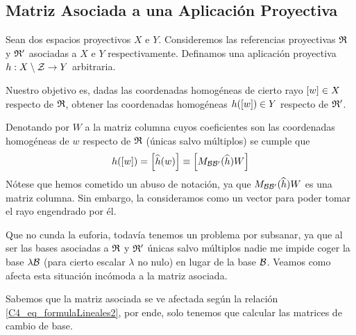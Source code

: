 \subsection{Matriz Asociada a una Aplicación Proyectiva}
Sean dos espacios proyectivos $X$ e $Y$. Consideremos las referencias proyectivas $\mathfrak{R}$ y $\mathfrak{R}'$ asociadas a $X$ e $Y$ respectivamente. Definamos una aplicación proyectiva $h:X\setminus \mathcal{Z}\to Y$ arbitraria.

Nuestro objetivo es, dadas las coordenadas homogéneas de cierto rayo $\left [ w \right ]\in X$ respecto de $\mathfrak{R}$, obtener las coordenadas homogéneas $h(\left [ w \right ])\in Y$ respecto de $\mathfrak{R}'$.

Denotando por $W$ a la matriz columna cuyos coeficientes son las coordenadas homogéneas de $w$ respecto de $\mathfrak{R}$ (únicas salvo múltiplos) se cumple que
\begin{equation}
	h(\left [ w \right ])=\left [ \widehat{h}(w) \right ]\equiv\left [ M_{\mathcal{B}\mathcal{B}'}(\widehat{h})W \right ]
\end{equation}
Nótese que hemos cometido un abuso de notación, ya que $M_{\mathcal{B}\mathcal{B}'}(\widehat{h})W$ es una matriz columna. Sin embargo, la consideramos como un vector para poder tomar el rayo engendrado por él.

Que no cunda la euforia, todavía tenemos un problema por subsanar, ya que al ser las bases asociadas a $\mathfrak{R}$ y $\mathfrak{R}'$ únicas salvo múltiplos nadie me impide coger la base $\lambda\mathcal{B}$ (para cierto escalar $\lambda$ no nulo) en lugar de la base $\mathcal{B}$. Veamos como afecta esta situación incómoda a la matriz asociada.

Sabemos que la matriz asociada se ve afectada según la relación \eqref{C4_eq_formulaLineales2}, por ende, solo tenemos que calcular las matrices de cambio de base.

